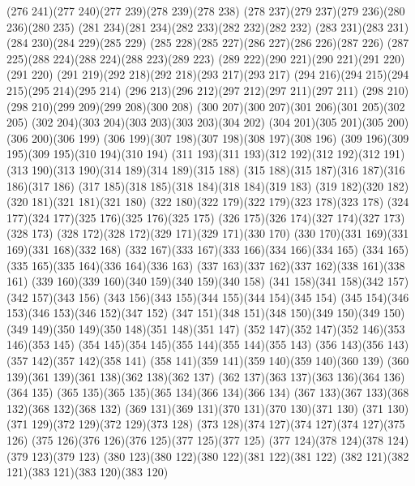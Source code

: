 \cpath (276 241)(277 240)(277 239)(278 239)(278 238)
\cpath (278 237)(279 237)(279 236)(280 236)(280 235)
\cpath (281 234)(281 234)(282 233)(282 232)(282 232)
\cpath (283 231)(283 231)(284 230)(284 229)(285 229)
\cpath (285 228)(285 227)(286 227)(286 226)(287 226)
\cpath (287 225)(288 224)(288 224)(288 223)(289 223)
\cpath (289 222)(290 221)(290 221)(291 220)(291 220)
\cpath (291 219)(292 218)(292 218)(293 217)(293 217)
\cpath (294 216)(294 215)(294 215)(295 214)(295 214)
\cpath (296 213)(296 212)(297 212)(297 211)(297 211)
\cpath (298 210)(298 210)(299 209)(299 208)(300 208)
\cpath (300 207)(300 207)(301 206)(301 205)(302 205)
\cpath (302 204)(303 204)(303 203)(303 203)(304 202)
\cpath (304 201)(305 201)(305 200)(306 200)(306 199)
\cpath (306 199)(307 198)(307 198)(308 197)(308 196)
\cpath (309 196)(309 195)(309 195)(310 194)(310 194)
\cpath (311 193)(311 193)(312 192)(312 192)(312 191)
\cpath (313 190)(313 190)(314 189)(314 189)(315 188)
\cpath (315 188)(315 187)(316 187)(316 186)(317 186)
\cpath (317 185)(318 185)(318 184)(318 184)(319 183)
\cpath (319 182)(320 182)(320 181)(321 181)(321 180)
\cpath (322 180)(322 179)(322 179)(323 178)(323 178)
\cpath (324 177)(324 177)(325 176)(325 176)(325 175)
\cpath (326 175)(326 174)(327 174)(327 173)(328 173)
\cpath (328 172)(328 172)(329 171)(329 171)(330 170)
\cpath (330 170)(331 169)(331 169)(331 168)(332 168)
\cpath (332 167)(333 167)(333 166)(334 166)(334 165)
\cpath (334 165)(335 165)(335 164)(336 164)(336 163)
\cpath (337 163)(337 162)(337 162)(338 161)(338 161)
\cpath (339 160)(339 160)(340 159)(340 159)(340 158)
\cpath (341 158)(341 158)(342 157)(342 157)(343 156)
\cpath (343 156)(343 155)(344 155)(344 154)(345 154)
\cpath (345 154)(346 153)(346 153)(346 152)(347 152)
\cpath (347 151)(348 151)(348 150)(349 150)(349 150)
\cpath (349 149)(350 149)(350 148)(351 148)(351 147)
\cpath (352 147)(352 147)(352 146)(353 146)(353 145)
\cpath (354 145)(354 145)(355 144)(355 144)(355 143)
\cpath (356 143)(356 143)(357 142)(357 142)(358 141)
\cpath (358 141)(359 141)(359 140)(359 140)(360 139)
\cpath (360 139)(361 139)(361 138)(362 138)(362 137)
\cpath (362 137)(363 137)(363 136)(364 136)(364 135)
\cpath (365 135)(365 135)(365 134)(366 134)(366 134)
\cpath (367 133)(367 133)(368 132)(368 132)(368 132)
\cpath (369 131)(369 131)(370 131)(370 130)(371 130)
\cpath (371 130)(371 129)(372 129)(372 129)(373 128)
\cpath (373 128)(374 127)(374 127)(374 127)(375 126)
\cpath (375 126)(376 126)(376 125)(377 125)(377 125)
\cpath (377 124)(378 124)(378 124)(379 123)(379 123)
\cpath (380 123)(380 122)(380 122)(381 122)(381 122)
\cpath (382 121)(382 121)(383 121)(383 120)(383 120)

